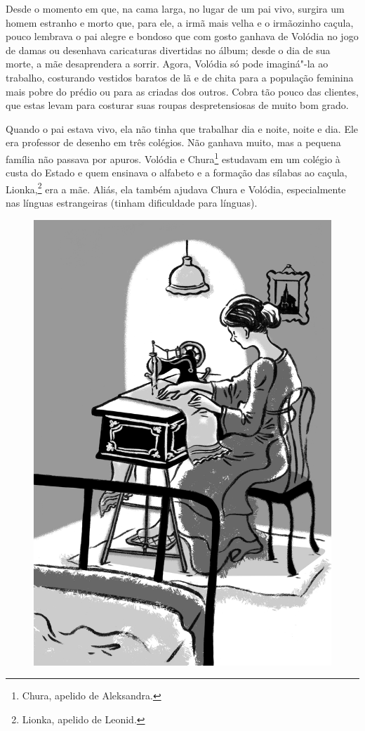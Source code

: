 Desde o momento em que, na cama larga, no lugar de um pai vivo, surgira
um homem estranho e morto que, para ele, a irmã mais velha e o
irmãozinho caçula, pouco lembrava o pai alegre e bondoso que com gosto
ganhava de Volódia no jogo de damas ou desenhava caricaturas divertidas
no álbum; desde o dia de sua morte, a mãe desaprendera a sorrir.
Agora, Volódia só pode imaginá"-la ao trabalho, costurando
vestidos baratos de lã e de chita para a população feminina mais pobre
do prédio ou para as criadas dos outros. Cobra tão pouco das
clientes, que estas levam para costurar suas roupas despretensiosas de
muito bom grado.

Quando o pai estava vivo, ela não tinha que trabalhar dia e noite, noite
e dia. Ele era professor de desenho em três colégios. Não ganhava muito,
mas a pequena família não passava por apuros. Volódia e Chura\footnote{Chura,
  apelido de Aleksandra.} estudavam em um colégio à custa do Estado e
quem ensinava o alfabeto e a formação das sílabas ao caçula,
Lionka,\footnote{Lionka, apelido de Leonid.} era a mãe. Aliás, ela
também ajudava Chura e Volódia, especialmente nas línguas estrangeiras
(tinham dificuldade para línguas).

\begin{figure}%
\vspace*{-2cm}
\hspace*{-2.5cm}\includegraphics{./imgs/cena13.jpg}
\end{figure}

